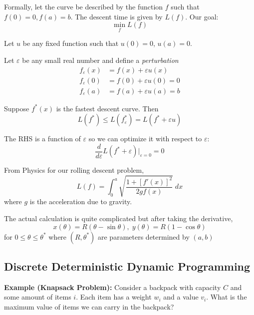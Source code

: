 \documentclass[12pt]{article}
\newcommand{\ep}{\varepsilon}
\begin{document}
    \begin{center}

    Formally, let the curve be described by the function $f$ such that $f(0) =0, f(a) = b$. The descent time is given by $L(f)$. Our goal:
    \[\min_f L(f)\]

    Let $u$ be any fixed function such that $u(0) = 0$, $u(a) = 0$. 

    Let $\ep$ be any small real number and define a \emph{perturbation} 
    \begin{align*}
        f_{\ep}(x) &= f(x) + \ep u(x)\\
        f_{\ep}(0) &= f(0) + \ep u(0) = 0\\
        f_{\ep}(a) &= f(a) + \ep u(a) = b
    \end{align*}
        
    Suppose $f^*(x)$ is the fastest descent curve. Then 
    \[L(f^*) \leq L(f^*_{\ep}) = L(f^* + \ep u)\]

    The RHS is a function of $\ep$ so we can optimize it with respect to $\ep$:
    \[\frac{d}{d\ep} L(f^* + \ep)\bigg\vert_{\ep = 0} = 0\]

    From Physics for our rolling descent problem, 
    \[L(f) = \int_0^a \sqrt{\frac{1 + [f'(x)]^2}{2gf(x)}}\; dx\] 
    where $g$ is the acceleration due to gravity.

    The actual calculation is quite complicated but after taking the derivative, 
    \[x(\theta) = R(\theta - \sin \theta), \; y(\theta) = R(1 - \cos \theta)\]
    for $0 \leq \theta \leq \theta^*$ where $(R, \theta^*)$ are parameters determined by $(a, b)$

\subsection*{Discrete Deterministic Dynamic Programming}
    \textbf{Example (Knapsack Problem):} Consider a backpack with capacity $C$ and some amount of items $i$. Each item has a weight $w_i$ and a value $v_i$. What is the maximum value of items we can carry in the backpack? 


\end{center}
\end{document}
